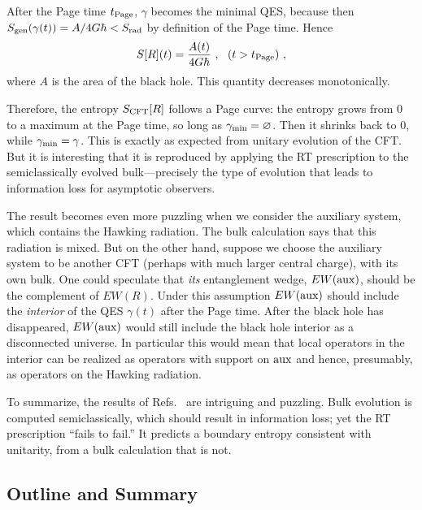 \documentclass[12pt,letterpaper]{article}
\begin{document}
After the Page time $t_{\rm Page}$, $\gamma$ becomes the minimal QES, because then $S_{\rm gen}(\gamma(t))=A/4G\hbar<S_{\rm rad}$ by definition of the Page time. Hence
\begin{equation}
S[R](t) = \frac{A(t)}{4G\hbar}~,~~(t>t_{\rm Page})~,
\end{equation}
where $A$ is the area of the black hole. This quantity decreases monotonically.

Therefore, the entropy $S_{\rm CFT}[R]$ follows a Page curve: the entropy grows from 0 to a maximum at the Page time, so long as $\gamma_{\rm min}=\varnothing$. Then it shrinks back to 0, while $\gamma_{\rm min}=\gamma$. This is exactly as expected from unitary evolution of the CFT. But it is interesting that it is reproduced by applying the RT prescription to the semiclassically evolved bulk---precisely the type of evolution that leads to information loss for asymptotic observers.%

The result becomes even more puzzling when we consider the auxiliary system, which contains the Hawking radiation. The bulk calculation says that this radiation is mixed. But on the other hand, suppose we choose the auxiliary system to be another CFT (perhaps with much larger central charge), with its own bulk. One could speculate that {\em its} entanglement wedge, $EW({\rm aux})$, should be the complement of $EW(R)$. Under this assumption $EW(\rm aux)$ should include the {\em interior} of the QES $\gamma(t)$ after the Page time. After the black hole has disappeared, $EW(\rm aux)$ would still include the black hole interior as a disconnected universe. In particular this would mean that local operators in the interior can be realized as operators with support on ${\rm aux}$ and hence, presumably, as operators on the Hawking radiation.

To summarize, the results of Refs.~\cite{Pen19,AEMM} are intriguing and puzzling. Bulk evolution is computed semiclassically, which should result in information loss; %
yet the RT prescription ``fails to fail.'' It predicts a boundary entropy consistent with unitarity, from a bulk calculation that is not.

\subsection{Outline and Summary}
\end{document}
